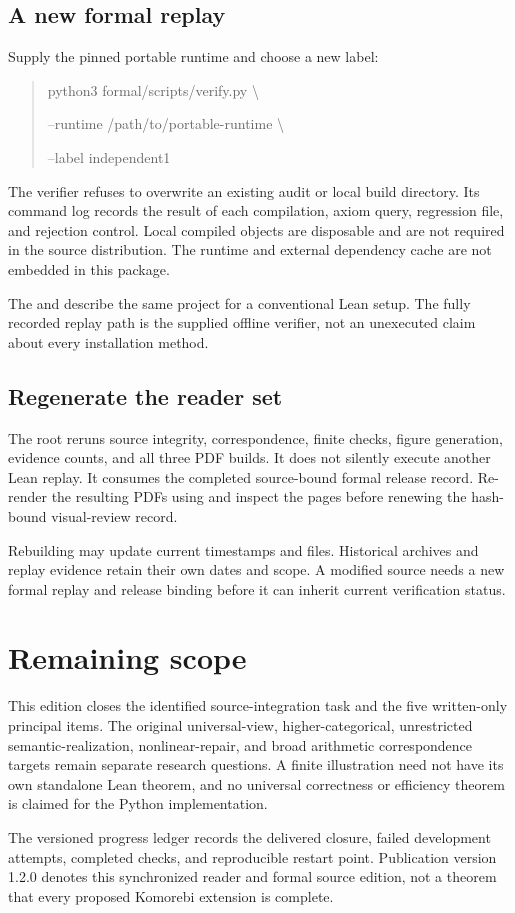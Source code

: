 \documentclass[11pt]{article}
\begin{document}
\subsection{A new formal replay}
Supply the pinned portable runtime and choose a new label:
\begin{quote}\small\ttfamily
python3 formal/scripts/verify.py \textbackslash\par
\hspace*{1em}--runtime /path/to/portable-runtime \textbackslash\par
\hspace*{1em}--label independent1
\end{quote}
The verifier refuses to overwrite an existing audit or local build directory. Its command log records the result of each compilation, axiom query, regression file, and rejection control. Local compiled objects are disposable and are not required in the source distribution. The runtime and external dependency cache are not embedded in this package.

The  and  describe the same project for a conventional Lean setup. The fully recorded replay path is the supplied offline verifier, not an unexecuted claim about every installation method.

\subsection{Regenerate the reader set}
The root  reruns source integrity, correspondence, finite checks, figure generation, evidence counts, and all three PDF builds. It does not silently execute another Lean replay. It consumes the completed source-bound formal release record. Re-render the resulting PDFs using  and inspect the pages before renewing the hash-bound visual-review record.

Rebuilding may update current timestamps and files. Historical archives and replay evidence retain their own dates and scope. A modified source needs a new formal replay and release binding before it can inherit current verification status.

\section{Remaining scope}
This edition closes the identified source-integration task and the five written-only principal items. The original universal-view, higher-categorical, unrestricted semantic-realization, nonlinear-repair, and broad arithmetic correspondence targets remain separate research questions. A finite illustration need not have its own standalone Lean theorem, and no universal correctness or efficiency theorem is claimed for the Python implementation.

The versioned progress ledger records the delivered closure, failed development attempts, completed checks, and reproducible restart point. Publication version 1.2.0 denotes this synchronized reader and formal source edition, not a theorem that every proposed Komorebi extension is complete.
\end{document}
